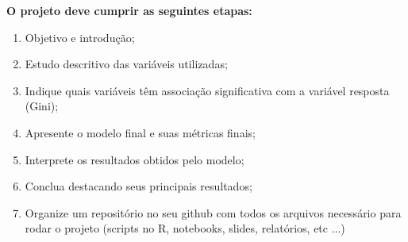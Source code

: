 \documentclass[thmsa,11pt]{article}
\begin{document}
\bigskip

\textbf{O projeto deve cumprir as seguintes etapas: }

\begin{enumerate}
	\item Objetivo e introdução;
	\item Estudo descritivo das variáveis utilizadas;
	\item Indique quais variáveis têm associação significativa com a variável resposta (Gini);
	\item Apresente o modelo final e suas métricas finais;
	\item Interprete os resultados obtidos pelo modelo;
	\item Conclua destacando seus principais resultados;
	\item Organize um repositório no seu github com todos os arquivos necessário para rodar o projeto (scripts no R, notebooks, slides, relatórios, etc ...)
\end{enumerate}
\end{document}
